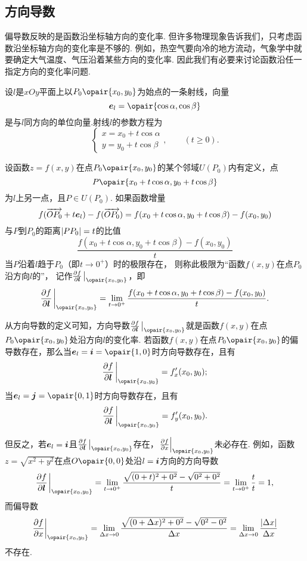 \subsection{方向导数}
偏导数反映的是函数沿坐标轴方向的变化率.
但许多物理现象告诉我们，只考虑函数沿坐标轴方向的变化率是不够的.
例如，热空气要向冷的地方流动，气象学中就要确定大气温度、气压沿着某些方向的变化率.
因此我们有必要来讨论函数沿任一指定方向的变化率问题.

\begin{definition}
设\(l\)是\(xOy\)平面上以\(P_0\opair{x_0,y_0}\)为始点的一条射线，向量\[
\mat{e}_l=\opair{\cos\alpha,\cos\beta}
\]是与\(l\)同方向的单位向量.射线\(l\)的参数方程为\[
\left\{ \begin{array}{l}
x=x_0+t\cos\alpha \\
y=y_0+t\cos\beta
\end{array} \right., \qquad (t \geqslant 0).
\]

设函数\(z=f(x,y)\)在点\(P_0\opair{x_0,y_0}\)的某个邻域\(U(P_0)\)内有定义，点\[
P\opair{x_0+t\cos\alpha,y_0+t\cos\beta}
\]为\(l\)上另一点，且\(P \in U(P_0)\).
如果函数增量\[
f(\overrightarrow{O P_0} + t \boldsymbol{e}_l) - f(\overrightarrow{O P_0})
= f(x_0+t\cos\alpha,y_0+t\cos\beta)-f(x_0,y_0)
\]与\(P\)到\(P_0\)的距离\(\abs{PP_0}=t\)的比值\[
\frac{f(x_0+t\cos\alpha,y_0+t\cos\beta)-f(x_0,y_0)}{t}
\]当\(P\)沿着\(l\)趋于\(P_0\)（即\(t\to0^+\)）时的极限存在，
则称此极限为“函数\(f(x,y)\)在点\(P_0\)沿方向\(l\)的”，
记作\(\pdv{f}{\mat{l}}\eval_{\opair{x_0,y_0}}\)，即\[
\pdv{f}{\mat{l}}\eval_{\opair{x_0,y_0}}
=\lim\limits_{t\to0^+} \frac{f(x_0+t\cos\alpha,y_0+t\cos\beta)-f(x_0,y_0)}{t}.
\]
\end{definition}

从方向导数的定义可知，方向导数\(\pdv{f}{\mat{l}}\eval_{\opair{x_0,y_0}}\)就是函数\(f(x,y)\)在点\(P_0\opair{x_0,y_0}\)处沿方向\(l\)的变化率.
若函数\(f(x,y)\)在点\(P_0\opair{x_0,y_0}\)的偏导数存在，那么当\(\mat{e}_l = \mat{i} = \opair{1,0}\)时方向导数存在，且有\[
\pdv{f}{\mat{l}}\eval_{\opair{x_0,y_0}} = f'_x(x_0,y_0);
\]当\(\mat{e}_l = \mat{j} = \opair{0,1}\)时方向导数存在，且有\[
\pdv{f}{\mat{l}}\eval_{\opair{x_0,y_0}} = f'_y(x_0,y_0).
\]

但反之，若\(\boldsymbol{e}_l = \boldsymbol{i}\)且\(\pdv{f}{\mat{l}}\eval_{\opair{x_0,y_0}}\)存在，\(\eval{\pdv{f}{x}}_{\opair{x_0,y_0}}\)未必存在.
例如，函数\(z = \sqrt{x^2+y^2}\)在点\(O\opair{0,0}\)处沿\(l = \boldsymbol{i}\)方向的方向导数\[
\pdv{f}{\mat{l}}\eval_{\opair{x_0,y_0}}
= \lim\limits_{t\to0^+} \frac{\sqrt{(0+t)^2+0^2}-\sqrt{0^2+0^2}}{t}
= \lim\limits_{t\to0^+} \frac{t}{t} = 1,
\]而偏导数\[
\eval{\pdv{f}{x}}_{\opair{x_0,y_0}}
= \lim\limits_{\increment x\to0} \frac{\sqrt{(0+\increment x)^2+0^2}-\sqrt{0^2-0^2}}{\increment x}
= \lim\limits_{\increment x\to0} \frac{\abs{\increment x}}{\increment x}
\]不存在.

